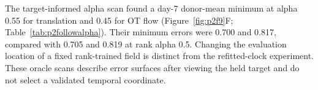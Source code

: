 The target-informed alpha scan found a day-7 donor-mean minimum at alpha 0.55 for translation and 0.45 for OT flow (Figure~\ref{fig:p2f9}F; Table~\ref{tab:p2followalpha}). Their minimum errors were 0.700 and 0.817, compared with 0.705 and 0.819 at rank alpha 0.5. Changing the evaluation location of a fixed rank-trained field is distinct from the refitted-clock experiment. These oracle scans describe error surfaces after viewing the held target and do not select a validated temporal coordinate.
